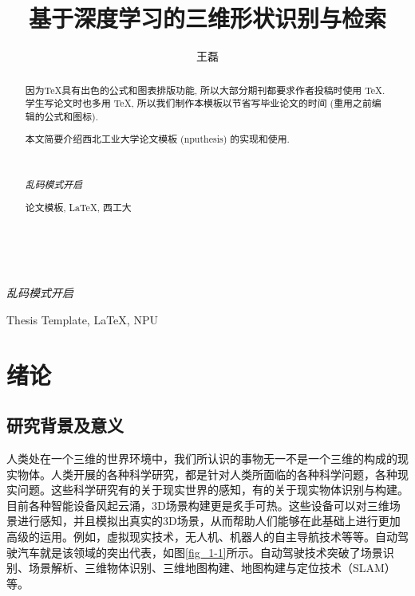 \documentclass[twoside,UTF8]{nputhesis}
\title[A Thesis Submitted For The Master Degree of Engineering]{基于深度学习的三维形状识别与检索}
\author[Lei Wang]{王磊}
\begin{document}
\makecover  %
\frontmatter

\begin{abstract}  
    因为\TeX 具有出色的公式和图表排版功能, 所以大部分期刊都要求作者投稿时使用
    \TeX. 学生写论文时也多用 \TeX, 所以我们制作本模板以节省写毕业论文的时间 
    (重用之前编辑的公式和图标).

    本文简要介绍西北工业大学论文模板 (nputhesis) 的实现和使用.

    { %
        \noindent\hrulefill\\
        {\centerline {\it 乱码模式开启}}
        \noindent\hrulefill
    }
    \begin{keywords}
        论文模板, \LaTeX, 西工大 
    \end{keywords}
\end{abstract}

\begin{Abstract}

    { %
        \noindent\hrulefill\\
        {\centerline {\it 乱码模式开启}}
        \noindent\hrulefill
    }
    \begin{Keywords}
        Thesis Template, \LaTeX, NPU
    \end{Keywords}
\end{Abstract}

\tableofcontents 

\mainmatter  %
\chapter{绪论}
\section{研究背景及意义}
人类处在一个三维的世界环境中，我们所认识的事物无一不是一个三维的构成的现实物体。人类开展的各种科学研究，都是针对人类所面临的各种科学问题，各种现实问题。这些科学研究有的关于现实世界的感知，有的关于现实物体识别与构建。目前各种智能设备风起云涌，3D场景构建更是炙手可热。这些设备可以对三维场景进行感知，并且模拟出真实的3D场景，从而帮助人们能够在此基础上进行更加高级的运用。例如，虚拟现实技术，无人机、机器人的自主导航技术等等。自动驾驶汽车就是该领域的突出代表，如图\ref{fig_1-1}所示。自动驾驶技术突破了场景识别、场景解析、三维物体识别、三维地图构建、地图构建与定位技术（SLAM）等。
\end{document}
